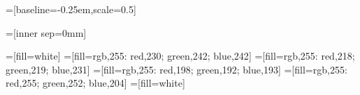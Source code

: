 \usetikzlibrary{arrows.meta}
\usetikzlibrary{arrows}
\usetikzlibrary{backgrounds}
\usetikzlibrary{decorations.pathreplacing}
\usetikzlibrary{matrix}
\usetikzlibrary{patterns}
\usetikzlibrary{positioning}
\usetikzlibrary{shapes,shapes.geometric,shapes.misc}






{}=[baseline=-0.25em,scale=0.5]



=[inner sep=0mm]

=[fill=white]
=[fill={rgb,255: red,230; green,242; blue,242}]
=[fill={rgb,255: red,218; green,219; blue,231}]
=[fill={rgb,255: red,198; green,192; blue,193}]
=[fill={rgb,255: red,255; green,252; blue,204}]
=[fill=white]

\newcommand{\umlobj}[4][]{
    \node[rectangle split, rectangle split parts=2, draw, align=center, text
        centered, inner sep=1.5ex, #1]
        (#3) {$\ll$#2$\gg$ \\ \textbf{#3} \nodepart[align=left]{second} #4};
}
\newcommand{\umlsimpleobj}[3][]{
    \node[draw, align=center, text centered, inner sep=1.5ex, #1]
        (#3) {$\ll$#2$\gg$ \\ \textbf{#3}};
}

